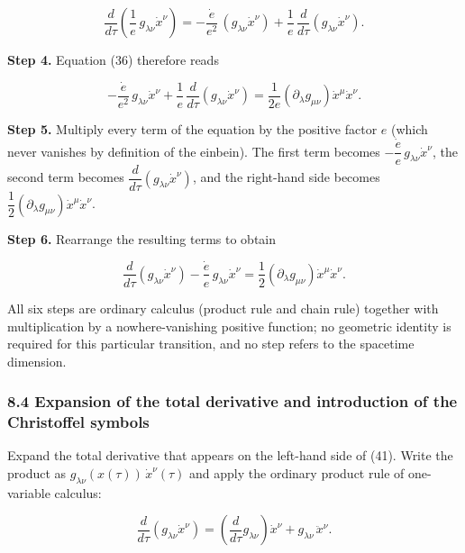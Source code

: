 \documentclass[
]{article}
\begin{document}
\[\frac{d}{d\tau} \left( \frac{1}{e}\, g_{\lambda\nu} \dot{x}^{\nu} \right) = - \frac{\dot{e}}{e^{2}}\, \left( g_{\lambda\nu} \dot{x}^{\nu} \right) + \frac{1}{e}\, \frac{d}{d\tau} \left( g_{\lambda\nu} \dot{x}^{\nu} \right). \tag{39}\]

\textbf{Step 4.} Equation (36) therefore reads

\[- \frac{\dot{e}}{e^{2}}\, g_{\lambda\nu} \dot{x}^{\nu} + \frac{1}{e}\, \frac{d}{d\tau} \left( g_{\lambda\nu} \dot{x}^{\nu} \right) = \frac{1}{2e} \left( \partial_{\lambda} g_{\mu\nu} \right) \dot{x}^{\mu} \dot{x}^{\nu}. \tag{40}\]

\textbf{Step 5.} Multiply every term of the equation by the positive
factor \(e\) (which never vanishes by definition of the einbein). The
first term becomes
\(- \dfrac{\dot{e}}{e}\, g_{\lambda\nu} \dot{x}^{\nu}\), the second term
becomes
\(\dfrac{d}{d\tau} \left( g_{\lambda\nu} \dot{x}^{\nu} \right)\), and
the right-hand side becomes
\(\dfrac{1}{2} \left( \partial_{\lambda} g_{\mu\nu} \right) \dot{x}^{\mu} \dot{x}^{\nu}\).

\textbf{Step 6.} Rearrange the resulting terms to obtain

\[\frac{d}{d\tau} \left( g_{\lambda\nu} \dot{x}^{\nu} \right) - \frac{\dot{e}}{e}\, g_{\lambda\nu} \dot{x}^{\nu} = \frac{1}{2} \left( \partial_{\lambda} g_{\mu\nu} \right) \dot{x}^{\mu} \dot{x}^{\nu}. \tag{41}\]

All six steps are ordinary calculus (product rule and chain rule)
together with multiplication by a nowhere-vanishing positive function;
no geometric identity is required for this particular transition, and no
step refers to the spacetime dimension.

\hypertarget{expansion-of-the-total-derivative-and-introduction-of-the-christoffel-symbols}{%
\subsubsection{8.4 Expansion of the total derivative and introduction of
the Christoffel
symbols}\label{expansion-of-the-total-derivative-and-introduction-of-the-christoffel-symbols}}

Expand the total derivative that appears on the left-hand side of (41).
Write the product as \(g_{\lambda\nu}(x(\tau))\, \dot{x}^{\nu}(\tau)\)
and apply the ordinary product rule of one-variable calculus:

\[\frac{d}{d\tau} \left( g_{\lambda\nu} \dot{x}^{\nu} \right) = \left( \frac{d}{d\tau} g_{\lambda\nu} \right) \dot{x}^{\nu} + g_{\lambda\nu}\, \ddot{x}^{\nu}. \tag{42}\]
\end{document}
